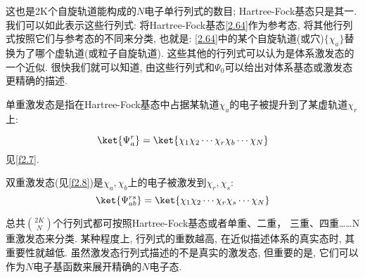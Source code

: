 这也是2K个自旋轨道能构成的$N$电子单行列式的数目; 
Hartree-Fock基态只是其一. 
我们可以如此表示这些行列式: 将Hartree-Fock基态\autoref{2.64}作为参考态, 
将其他行列式按照它们与参考态的不同来分类, 
也就是: \autoref{2.64}中的某个自旋轨道(或穴)$\{\chi_a\}$替换为了哪个虚轨道(或粒子自旋轨道). 
这些其他的行列式可以认为是体系激发态的一个近似. 
很快我们就可以知道, 
由这些行列式和$\Psi_0$可以给出对体系基态或激发态更精确的描述.


单重激发态是指在Hartree-Fock基态中占据某轨道$\chi_a$的电子被提升到了某虚轨道$\chi_r$上:

\begin{equation}
\ket{\Psi_a^r}=\ket{\chi_1\chi_2\cdots\chi_r\chi_b\cdots\chi_N}
\end{equation}
见\autoref{f2.7}.


双重激发态(见\autoref{f2.8})是$\chi_a,\chi_b$上的电子被激发到$\chi_r,\chi_s$:
\begin{equation}
\ket{\Psi_{ab}^{rs}}=\ket{\chi_1\chi_2\cdots\chi_r\chi_s\cdots\chi_N}
\end{equation}

总共$\binom{2K}{N}$个行列式都可按照Hartree-Fock基态或者单重、二重，
三重、四重……N重激发态来分类. 
某种程度上, 
行列式的重数越高, 
在近似描述体系的真实态时, 
其重要性就越低. 
虽然激发态行列式描述的不是真实的激发态, 
但重要的是, 
它们可以作为$N$电子基函数来展开精确的$N$电子态.

